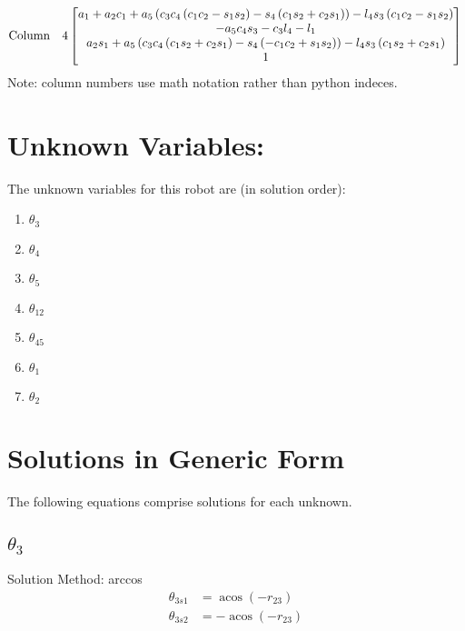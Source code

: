 \documentclass[letterpaper]{article}
\begin{document}
\begin{dmath}
\mathrm{Column \quad4}
\left[\begin{matrix}a_{1} + a_{2} c_{1} + a_{5} \left(c_{3} c_{4} \left(c_{1} c_{2} - s_{1} s_{2}\right) - s_{4} \left(c_{1} s_{2} + c_{2} s_{1}\right)\right) - l_{4} s_{3} \left(c_{1} c_{2} - s_{1} s_{2}\right)\\- a_{5} c_{4} s_{3} - c_{3} l_{4} - l_{1}\\a_{2} s_{1} + a_{5} \left(c_{3} c_{4} \left(c_{1} s_{2} + c_{2} s_{1}\right) - s_{4} \left(- c_{1} c_{2} + s_{1} s_{2}\right)\right) - l_{4} s_{3} \left(c_{1} s_{2} + c_{2} s_{1}\right)\\1\end{matrix}\right]\\
\end{dmath}
Note: column numbers use math notation rather than python indeces.



\section{Unknown Variables: }
The unknown variables for this robot are (in solution order): 
\begin{enumerate}

\item {$\theta_{3}$}
\item {$\theta_{4}$}
\item {$\theta_{5}$}
\item {$\theta_{12}$}
\item {$\theta_{45}$}
\item {$\theta_{1}$}
\item {$\theta_{2}$}\end{enumerate}



\section{Solutions in Generic Form} 
 The following equations comprise solutions for each unknown.

\subsection{$\theta_{3}$ } 
Solution Method: arccos
\begin{align}
  \theta_{3s1} &= \operatorname{acos}{\left(- r_{23} \right)} \\
  \theta_{3s2} &= - \operatorname{acos}{\left(- r_{23} \right)} \end{align} 
\end{document}
